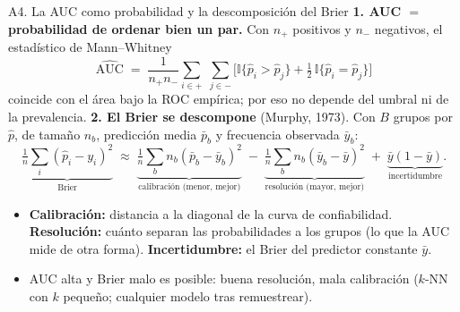 \documentclass{beamer}
\newcommand{\1}{\mathbb{I}}
\begin{document}
\begin{frame}{A4. La AUC como probabilidad y la descomposición del Brier}
\small
\textbf{1. AUC $=$ probabilidad de ordenar bien un par.} Con $n_+$ positivos y $n_-$ negativos, el estadístico de Mann--Whitney
\[ \widehat{\text{AUC}} \;=\; \frac{1}{n_+ n_-} \sum_{i \in +}\;\sum_{j \in -} \Big[ \1\{\hat{p}_i > \hat{p}_j\} + \tfrac{1}{2}\,\1\{\hat{p}_i = \hat{p}_j\} \Big] \]
coincide con el área bajo la ROC empírica; por eso no depende del umbral ni de la prevalencia.
\pause
\textbf{2. El Brier se descompone} (Murphy, 1973). Con $B$ grupos por $\hat{p}$, de tamaño $n_b$, predicción media $\bar{p}_b$ y frecuencia observada $\bar{y}_b$:
\[ \underbrace{\tfrac{1}{n}\textstyle\sum_i (\hat{p}_i - y_i)^2}_{\text{Brier}} \;\approx\; \underbrace{\tfrac{1}{n}\textstyle\sum_b n_b (\bar{p}_b - \bar{y}_b)^2}_{\text{calibración (menor, mejor)}} \;-\; \underbrace{\tfrac{1}{n}\textstyle\sum_b n_b (\bar{y}_b - \bar{y})^2}_{\text{resolución (mayor, mejor)}} \;+\; \underbrace{\bar{y}(1 - \bar{y})}_{\text{incertidumbre}}. \]
\pause
\begin{itemize}\itemsep2pt
  \item \textbf{Calibración:} distancia a la diagonal de la curva de confiabilidad. \textbf{Resolución:} cuánto separan las probabilidades a los grupos (lo que la AUC mide de otra forma). \textbf{Incertidumbre:} el Brier del predictor constante $\bar{y}$.
  \item AUC alta y Brier malo es posible: buena resolución, mala calibración ($k$-NN con $k$ pequeño; cualquier modelo tras remuestrear).
\end{itemize}
\end{frame}

\end{document}
